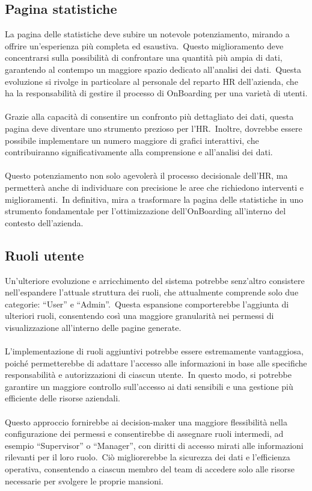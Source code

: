 \subsection{Pagina statistiche}\label{sec:cap_sec_subsec}
La pagina delle statistiche deve subire un notevole potenziamento, mirando a offrire un'esperienza più completa ed esaustiva.\ 
Questo miglioramento deve concentrarsi sulla possibilità di confrontare una quantità più ampia di dati, 
garantendo al contempo un maggiore spazio dedicato all'analisi dei dati.\ 
Questa evoluzione si rivolge in particolare al personale del reparto HR dell'azienda, 
che ha la responsabilità di gestire il processo di OnBoarding per una varietà di utenti.
\\ \\
Grazie alla capacità di consentire un confronto più dettagliato dei dati, questa pagina deve diventare uno strumento prezioso per l'HR.\ 
Inoltre, dovrebbe essere possibile implementare un numero maggiore di grafici interattivi, che contribuiranno significativamente 
alla comprensione e all'analisi dei dati.
\\ \\
Questo potenziamento non solo agevolerà il processo decisionale dell'HR, ma permetterà anche di individuare con precisione le aree 
che richiedono interventi e miglioramenti.\ In definitiva, mira a trasformare la pagina delle statistiche in uno strumento 
fondamentale per l'ottimizzazione dell'OnBoarding all'interno del contesto dell'azienda.
%
\subsection{Ruoli utente}\label{sec:cap_sec_subsec}
Un'ulteriore evoluzione e arricchimento del sistema potrebbe senz'altro consistere nell'espandere 
l'attuale struttura dei ruoli, che attualmente comprende solo due categorie: ``User'' e ``Admin''.\ 
Questa espansione comporterebbe l'aggiunta di ulteriori ruoli, consentendo così una maggiore granularità nei 
permessi di visualizzazione all'interno delle pagine generate.
\\ \\  
L'implementazione di ruoli aggiuntivi potrebbe essere estremamente vantaggiosa, poiché permetterebbe di adattare 
l'accesso alle informazioni in base alle specifiche responsabilità e autorizzazioni di ciascun utente.\ 
In questo modo, si potrebbe garantire un maggiore controllo sull'accesso ai dati sensibili e una gestione 
più efficiente delle risorse aziendali.
\\ \\
Questo approccio fornirebbe ai decision-maker una maggiore flessibilità nella configurazione dei permessi e consentirebbe 
di assegnare ruoli intermedi, ad esempio ``Supervisor'' o ``Manager'', con diritti di accesso mirati alle informazioni rilevanti 
per il loro ruolo.\ Ciò migliorerebbe la sicurezza dei dati e l'efficienza operativa, 
consentendo a ciascun membro del team di accedere solo alle risorse necessarie per svolgere le proprie mansioni.
%
